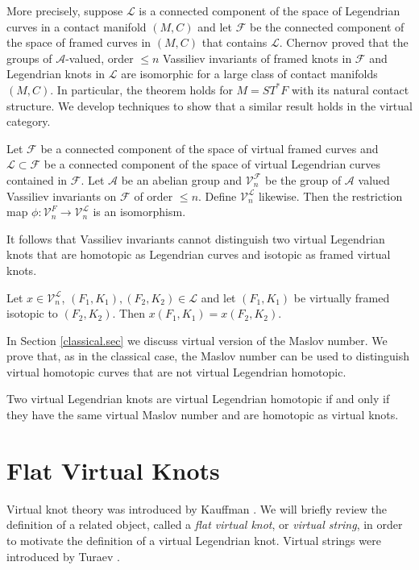 More precisely, suppose $\mathcal{L}$ is a connected component of the space of Legendrian curves in a contact manifold $(M,C)$ and let $\mathcal{F}$ be the connected component of the space of framed curves in $(M,C)$ that contains $\mathcal{L}$.  Chernov proved that the groups of $\mathcal{A}$-valued, order $\leq n$ Vassiliev invariants of framed knots in $\mathcal{F}$ and Legendrian knots in $\mathcal{L}$ are isomorphic for a large class of contact manifolds $(M,C)$.  In particular, the theorem holds for $M=ST^*F$ with its natural contact structure. We develop techniques to show that a similar result holds in the virtual category.
\begin{thm} \label{mainthm}
Let $\mathcal{F}$ be a connected component of the space of virtual framed curves and $\mathcal{L}\subset\mathcal{F}$ be a connected component of the space of virtual Legendrian curves contained in $\mathcal{F}$.  Let $\mathcal{A}$ be an abelian group and $\mathcal{V}_n^\mathcal{F}$ be the group of $\mathcal{A}$ valued Vassiliev invariants on $\mathcal{F}$ of order $\leq n$.  Define $\mathcal{V}_n^\mathcal{L}$ likewise.  Then the restriction map $\phi:\mathcal{V}_n^{F}\rightarrow\mathcal{V}_n^\mathcal{L}$ is an isomorphism.
\end{thm}
It follows that Vassiliev invariants cannot distinguish two virtual Legendrian knots that are homotopic as Legendrian curves and isotopic as framed virtual knots.

\begin{thm}\label{maincor}
Let $x\in \mathcal{V}_n^\mathcal{L}$, $(F_1, K_1), (F_2, K_2) \in \mathcal{L}$ and let $(F_1, K_1)$ be virtually framed isotopic to $(F_2, K_2)$.  Then $x(F_1, K_1) = x(F_2, K_2)$.
\end{thm}

In Section \ref{classical.sec} we discuss virtual version of the Maslov number.  We prove that, as in the classical case, the Maslov number can be used to distinguish virtual homotopic curves that are not virtual Legendrian homotopic.

\begin{thm} Two virtual Legendrian knots are virtual Legendrian homotopic if and only if they have the same virtual Maslov number and are homotopic as virtual knots.
\end{thm}


\section{Flat Virtual Knots}
Virtual knot theory was introduced by Kauffman \cite{Kauffman}.  We will briefly review the definition of a related object, called a {\it flat virtual knot}, or {\it virtual string}, in order to motivate the definition of a virtual Legendrian knot.  Virtual strings were introduced by Turaev \cite{Turaev}.



